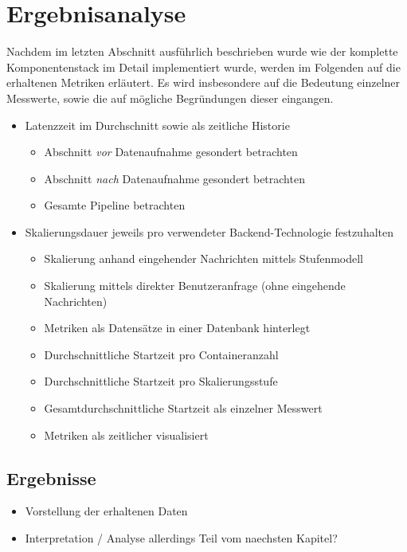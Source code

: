 \chapter{Ergebnisanalyse}

Nachdem im letzten Abschnitt ausführlich beschrieben wurde wie der komplette Komponentenstack im Detail implementiert wurde, werden im Folgenden auf die erhaltenen Metriken erläutert. Es wird insbesondere auf die Bedeutung einzelner Messwerte, sowie die auf mögliche Begründungen dieser eingangen.


\begin{itemize}
  \item Latenzzeit im Durchschnitt sowie als zeitliche Historie
  \begin{itemize}
    \item Abschnitt \emph{vor} Datenaufnahme gesondert betrachten
    \item Abschnitt \emph{nach} Datenaufnahme gesondert betrachten
    \item Gesamte Pipeline betrachten
  \end{itemize}
  \item Skalierungsdauer jeweils pro verwendeter Backend-Technologie festzuhalten
  \begin{itemize}
    \item Skalierung anhand eingehender Nachrichten mittels Stufenmodell
    \item Skalierung mittels direkter Benutzeranfrage (ohne eingehende Nachrichten)
    \item Metriken als Datensätze in einer Datenbank hinterlegt
    \item Durchschnittliche Startzeit pro Containeranzahl 
    \item Durchschnittliche Startzeit pro Skalierungsstufe 
    \item Gesamtdurchschnittliche Startzeit als einzelner Messwert
    \item Metriken als zeitlicher visualisiert
  \end{itemize}
\end{itemize}




\section{Ergebnisse}
\begin{itemize}
  \item Vorstellung der erhaltenen Daten
  \item Interpretation / Analyse allerdings Teil vom naechsten Kapitel?
\end{itemize}

